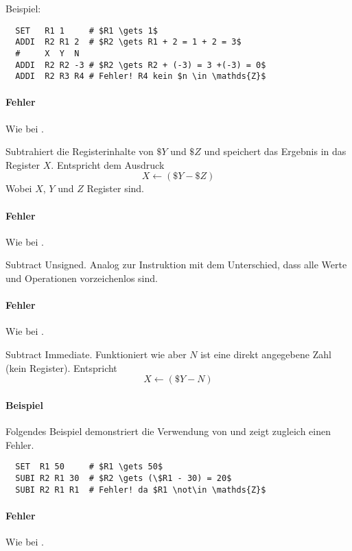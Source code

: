 Beispiel:
\begin{lstlisting}
  SET   R1 1     # $R1 \gets 1$
  ADDI  R2 R1 2  # $R2 \gets R1 + 2 = 1 + 2 = 3$
  #     X  Y  N
  ADDI  R2 R2 -3 # $R2 \gets R2 + (-3) = 3 +(-3) = 0$
  ADDI  R2 R3 R4 # Fehler! R4 kein $n \in \mathds{Z}$
\end{lstlisting}

\paragraph{Fehler}
Wie bei .


Subtrahiert die Registerinhalte von $\$Y$ und $\$Z$ und speichert das Ergebnis
in das Register $X$. Entspricht dem Ausdruck
\[
    X \gets (\$Y - \$Z)
\]
Wobei $X$, $Y$ und $Z$ Register sind.

\paragraph{Fehler}
Wie bei .


\glqq Subtract Unsigned\grqq.
Analog zur Instruktion  mit dem Unterschied, dass alle Werte und
Operationen vorzeichenlos sind.

\paragraph{Fehler}
Wie bei .


\glqq Subtract Immediate\grqq.
Funktioniert wie  aber $N$ ist eine direkt angegebene Zahl
(kein Register). Entspricht
\[
    X \gets (\$Y - N)
\]

\paragraph{Beispiel}
Folgendes Beispiel demonstriert die Verwendung von  und zeigt
zugleich einen Fehler.
\begin{lstlisting}
  SET  R1 50     # $R1 \gets 50$
  SUBI R2 R1 30  # $R2 \gets (\$R1 - 30) = 20$
  SUBI R2 R1 R1  # Fehler! da $R1 \not\in \mathds{Z}$
\end{lstlisting}

\paragraph{Fehler}
Wie bei .


